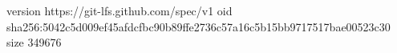 version https://git-lfs.github.com/spec/v1
oid sha256:5042c5d009ef45afdcfbc90b89ffe2736c57a16c5b15bb9717517bae00523c30
size 349676
